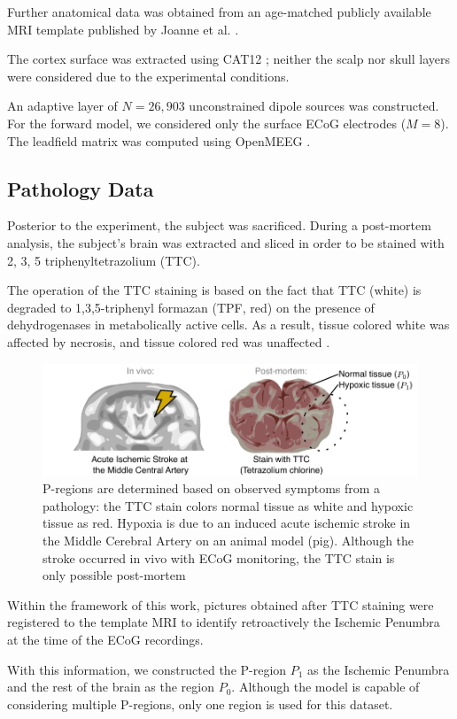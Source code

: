 Further anatomical data was obtained from an age-matched publicly available MRI template published by Joanne et al. \cite{pig_template}.

The cortex surface was extracted using CAT12 \cite{gaser2022cat}; neither the scalp nor skull layers were considered due to the experimental conditions.

An adaptive layer of $N=26,903$ unconstrained dipole sources was constructed.
%
For the forward model, we considered only the surface ECoG electrodes ($M=8$).
%
The leadfield matrix was computed using OpenMEEG \cite{gramfort2010openmeeg}.

\subsection{Pathology Data}

Posterior to the experiment, the subject was sacrificed.
%
During a post-mortem analysis, the subject's brain was extracted and sliced in order to be stained with 
2, 3, 5 triphenyltetrazolium (TTC).

The operation of the TTC staining is based on the fact that TTC (white) 
is degraded to 1,3,5-triphenyl formazan (TPF, red)
on the presence of dehydrogenases in metabolically active cells.
%
As a result, tissue colored white was affected by necrosis, and tissue colored red was unaffected \cite{li2018use}. 

\begin{figure}
\centering
\includegraphics[width=\linewidth]{./img/Pregions_real.pdf}
\caption{P-regions are determined based on observed symptoms from a pathology: the TTC stain colors normal tissue as white and hypoxic tissue as red.
%
Hypoxia is due to an induced acute ischemic stroke in the Middle Cerebral Artery on an animal model (pig).
%
Although the stroke occurred in vivo with ECoG monitoring, the TTC stain is only possible post-mortem}
\end{figure}

Within the framework of this work, pictures obtained after TTC staining were registered to the template MRI to identify retroactively the Ischemic Penumbra at the time of the ECoG recordings.
%

With this information, we constructed the P-region $P_1$ as the Ischemic Penumbra and the rest of the brain as the region $P_0$.
%
%
Although the model is capable of considering multiple P-regions, only one region is used for this dataset.
